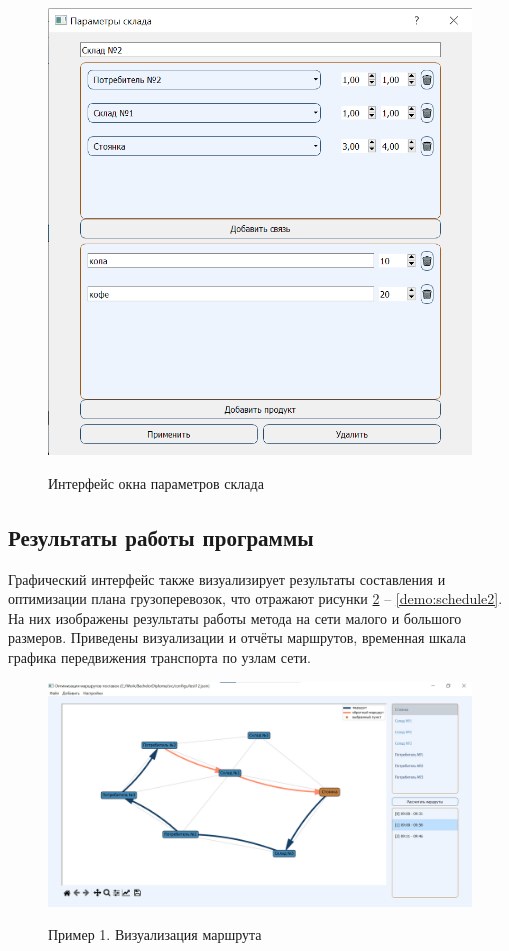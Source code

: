 \begin{figure}[hp]
	\begin{center}
		{\includegraphics[scale=0.8, angle=0, page=1]{img/warehouse_page.png}}
		\caption{Интерфейс окна параметров склада}
		\label{gui:warehouse}
	\end{center}
\end{figure}


\subsection{Результаты работы программы}
Графический интерфейс также визуализирует результаты составления и оптимизации плана грузоперевозок, что отражают рисунки \ref{demo:routes1} -- \ref{demo:schedule2}. На них изображены результаты работы метода на сети малого и большого размеров. Приведены визуализации и отчёты маршрутов, временная шкала графика передвижения транспорта по узлам сети.

\begin{figure}[h]
	\begin{center}
		{\includegraphics[scale=0.45, angle=0, page=1]{img/demo_routes_1.png}}
		\caption{Пример 1. Визуализация маршрута}
		\label{demo:routes1}
	\end{center}
\end{figure}

